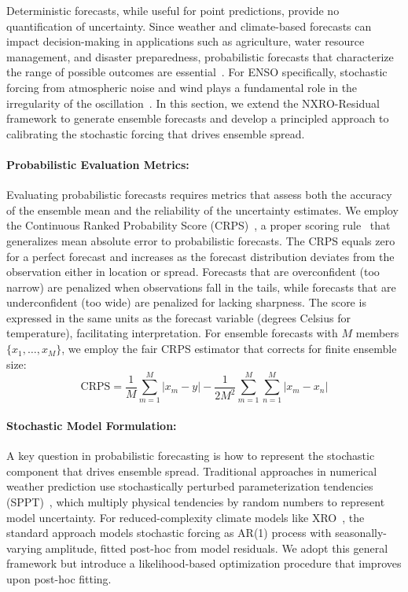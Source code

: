 Deterministic forecasts, while useful for point predictions, provide no quantification of uncertainty. Since weather and climate-based forecasts can impact decision-making in applications such as agriculture, water resource management, and disaster preparedness,  probabilistic forecasts that characterize the range of possible outcomes are essential~\cite{gneiting2014probabilistic}. For ENSO specifically, stochastic forcing from atmospheric noise and wind plays a fundamental role in the irregularity of the oscillation~\cite{kleeman2008stochastic}. In this section, we extend the NXRO-Residual framework to generate ensemble forecasts and develop a principled approach to calibrating the stochastic forcing that drives ensemble spread.

\paragraph{Probabilistic Evaluation Metrics: }Evaluating probabilistic forecasts requires metrics that assess both the accuracy of the ensemble mean and the reliability of the uncertainty estimates. We employ the Continuous Ranked Probability Score (CRPS)~\cite{hersbach2000}, a proper scoring rule~\cite{gneiting2007} that generalizes mean absolute error to probabilistic forecasts. The CRPS equals zero for a perfect forecast and increases as the forecast distribution deviates from the observation either in location or spread.  Forecasts that are overconfident (too narrow) are penalized when observations fall in the tails, while forecasts that are underconfident (too wide) are penalized for lacking sharpness. The score is expressed in the same units as the forecast variable (degrees Celsius for temperature), facilitating interpretation. For ensemble forecasts with $M$ members $\{x_1, \ldots, x_M\}$, we employ the fair CRPS estimator that corrects for finite ensemble size:
\begin{equation}
    \text{CRPS} = \frac{1}{M}\sum_{m=1}^{M} |x_m - y| - \frac{1}{2M^2}\sum_{m=1}^{M}\sum_{n=1}^{M} |x_m - x_n|
    \label{eq:crps_fair}
\end{equation}

\paragraph{Stochastic Model Formulation: }A key question in probabilistic forecasting is how to represent the stochastic component that drives ensemble spread. Traditional approaches in numerical weather prediction use stochastically perturbed parameterization tendencies (SPPT)~\cite{buizza1999stochastic}, which multiply physical tendencies by random numbers to represent model uncertainty. For reduced-complexity climate models like XRO~\cite{zhao2024xro}, the standard approach models stochastic forcing as  AR(1) process with seasonally-varying amplitude, fitted post-hoc from model residuals. We adopt this general framework but introduce a likelihood-based optimization procedure that improves upon post-hoc fitting.

